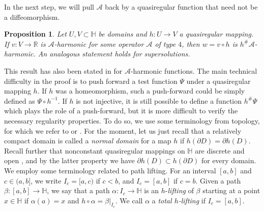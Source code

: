 \documentclass[10pt,letterpaper]{amsart}
\newtheorem{prop}[thm]{Proposition}
\theoremstyle{definition}
\numberwithin{thm}{subsection}
\numberwithin{equation}{section}
\begin{document}
In the next step, we will pull $\mathcal A$ back by a quasiregular function that need not be a diffeomorphism.

\begin{prop}\label{prop:secondMorphism}
Let $U, V\subset {\mathbb H}$ be domains and $h: U \rightarrow V$ a
quasiregular mapping. If $v: V \rightarrow {\mathbb R}$ is $\mathcal
A$-harmonic for some operator $\mathcal A$ of type $4$, then $w =
v\circ h$ is $h^\#\mathcal A$-harmonic. An analogous statement
holds for supersolutions.
\end{prop}

This result has also been stated in \cite[Theorem 9]{MR1672629}
for $\mathcal{A}$-harmonic functions. The main technical difficulty in the proof is to push forward a test function $\Psi$ under a quasiregular mapping $h$. If $h$ was a homeomorphism, such a push-forward could be simply defined as $\Psi \circ h^{-1}$. If $h$ is not injective, it is still possible to define a function $h^\#\Psi$ which plays the role of a push-forward, but it is more difficult to verify the necessary regularity properties.
To do so, we use some terminology from
topology, for which we refer to \cite{MR1238941} or
\cite[14.9]{MR1207810}. For the moment, let us just recall that a
relatively compact domain is called a \emph{normal domain} for a
map $h$ if $h(\partial D)=
\partial h(D)$. Recall further that nonconstant quasiregular mappings on
${\mathbb H}$ are discrete and open \cite{Da}, and by the latter
property we have $\partial h(D) \subset h(\partial D)$ for every
domain. We employ some terminology related to path
lifting. For an interval $[a,b]$ and $c\in (a,b]$, we write $I_c
= [a,c)$ if $c<b$, and $I_c=[a,b]$ if $c=b$. Given a path
$\beta:[a,b]\to {\mathbb H}$, we say that a path $\alpha: I_c \to {\mathbb H}$
is an $h$-\emph{lifting} of $\beta$ starting at a point $x\in {\mathbb H}$  if $\alpha(a)=x$ and $h\circ \alpha=\beta|_{I_c}$. We
call $\alpha$ a \emph{total $h$-lifting} if $I_c=[a,b]$.
\end{document}
